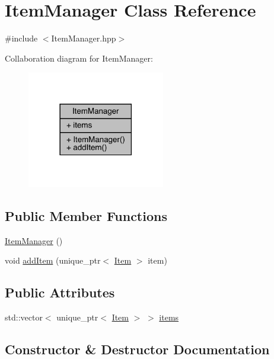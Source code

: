 \hypertarget{class_item_manager}{}\section{Item\+Manager Class Reference}
\label{class_item_manager}


{\ttfamily \#include $<$Item\+Manager.\+hpp$>$}



Collaboration diagram for Item\+Manager\+:
\nopagebreak
\begin{figure}[H]
\begin{center}
\leavevmode
\includegraphics[width=170pt]{class_item_manager__coll__graph}
\end{center}
\end{figure}
\subsection*{Public Member Functions}
\begin{DoxyCompactItemize}
\item 
\mbox{\hyperlink{class_item_manager_a1eab68c1b49e695ba96330da469b23cc}{Item\+Manager}} ()
\item 
void \mbox{\hyperlink{class_item_manager_af86e2b751da18d6d142c29f8c4860323}{add\+Item}} (unique\+\_\+ptr$<$ \mbox{\hyperlink{class_item}{Item}} $>$ item)
\end{DoxyCompactItemize}
\subsection*{Public Attributes}
\begin{DoxyCompactItemize}
\item 
std\+::vector$<$ unique\+\_\+ptr$<$ \mbox{\hyperlink{class_item}{Item}} $>$ $>$ \mbox{\hyperlink{class_item_manager_a67bf78a9baf31874b6cd6309e0d86e1e}{items}}
\end{DoxyCompactItemize}


\subsection{Constructor \& Destructor Documentation}
\mbox{\label{class_item_manager_a1eab68c1b49e695ba96330da469b23cc}} 
